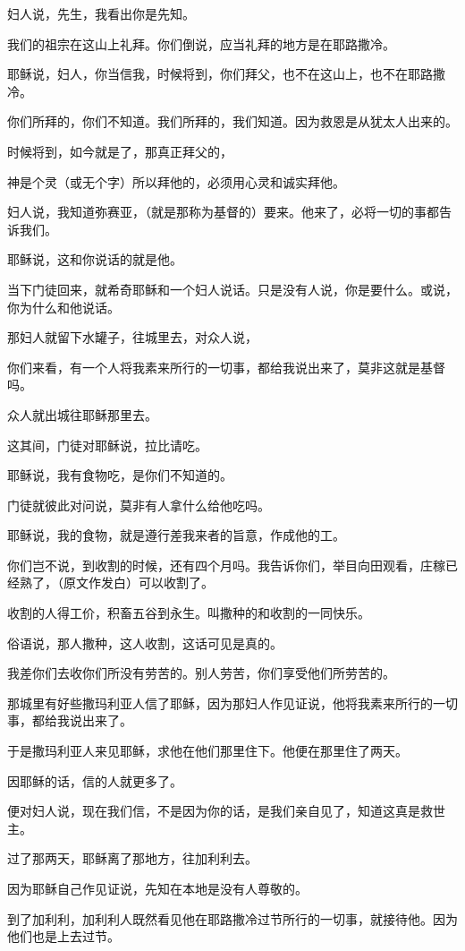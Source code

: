 \documentclass[12pt,oneside]{book}
\begin{document}
妇人说，先生，我看出你是先知。

我们的祖宗在这山上礼拜。你们倒说，应当礼拜的地方是在耶路撒冷。

耶稣说，妇人，你当信我，时候将到，你们拜父，也不在这山上，也不在耶路撒冷。

你们所拜的，你们不知道。我们所拜的，我们知道。因为救恩是从犹太人出来的。

时候将到，如今就是了，那真正拜父的，

神是个灵（或无个字）所以拜他的，必须用心灵和诚实拜他。

妇人说，我知道弥赛亚，（就是那称为基督的）要来。他来了，必将一切的事都告诉我们。

耶稣说，这和你说话的就是他。

当下门徒回来，就希奇耶稣和一个妇人说话。只是没有人说，你是要什么。或说，你为什么和他说话。

那妇人就留下水罐子，往城里去，对众人说，

你们来看，有一个人将我素来所行的一切事，都给我说出来了，莫非这就是基督吗。

众人就出城往耶稣那里去。

这其间，门徒对耶稣说，拉比请吃。

耶稣说，我有食物吃，是你们不知道的。

门徒就彼此对问说，莫非有人拿什么给他吃吗。

耶稣说，我的食物，就是遵行差我来者的旨意，作成他的工。

你们岂不说，到收割的时候，还有四个月吗。我告诉你们，举目向田观看，庄稼已经熟了，（原文作发白）可以收割了。

收割的人得工价，积畜五谷到永生。叫撒种的和收割的一同快乐。

俗语说，那人撒种，这人收割，这话可见是真的。

我差你们去收你们所没有劳苦的。别人劳苦，你们享受他们所劳苦的。

那城里有好些撒玛利亚人信了耶稣，因为那妇人作见证说，他将我素来所行的一切事，都给我说出来了。

于是撒玛利亚人来见耶稣，求他在他们那里住下。他便在那里住了两天。

因耶稣的话，信的人就更多了。

便对妇人说，现在我们信，不是因为你的话，是我们亲自见了，知道这真是救世主。

过了那两天，耶稣离了那地方，往加利利去。

因为耶稣自己作见证说，先知在本地是没有人尊敬的。

到了加利利，加利利人既然看见他在耶路撒冷过节所行的一切事，就接待他。因为他们也是上去过节。
\end{document}
